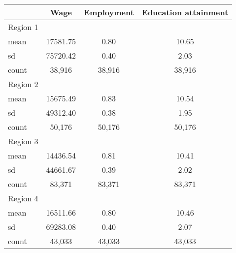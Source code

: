 {
\def\sym#1{\ifmmode^{#1}\else\(^{#1}\)\fi}
\begin{tabular*}{\textwidth}{@{\hskip\tabcolsep\extracolsep\fill}l*{1}{ccc}}
\toprule
            &        Wage&  Employment&Education attainment\\
\midrule
Region 1    &            &            &            \\
mean        &    17581.75&        0.80&       10.65\\
sd          &    75720.42&        0.40&        2.03\\
count       &      38,916&      38,916&      38,916\\
\midrule
Region 2    &            &            &            \\
mean        &    15675.49&        0.83&       10.54\\
sd          &    49312.40&        0.38&        1.95\\
count       &      50,176&      50,176&      50,176\\
\midrule
Region 3    &            &            &            \\
mean        &    14436.54&        0.81&       10.41\\
sd          &    44661.67&        0.39&        2.02\\
count       &      83,371&      83,371&      83,371\\
\midrule
Region 4    &            &            &            \\
mean        &    16511.66&        0.80&       10.46\\
sd          &    69283.08&        0.40&        2.07\\
count       &      43,033&      43,033&      43,033\\
\bottomrule
\end{tabular*}
}
